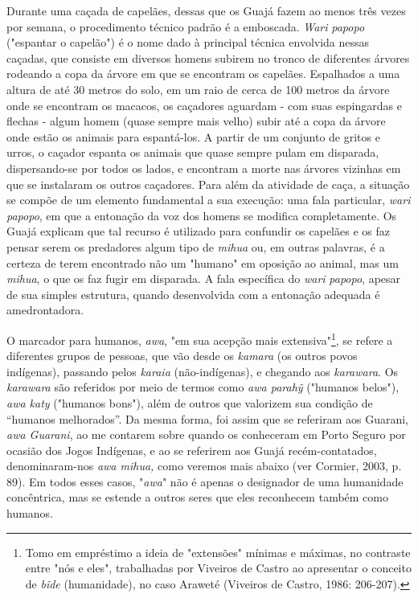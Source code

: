 Durante uma caçada de capelães, dessas que os Guajá fazem ao menos três
vezes por semana, o procedimento técnico padrão é a emboscada.
\emph{Wari} \emph{papopo} ("espantar o capelão") é o nome dado à
principal técnica envolvida nessas caçadas, que consiste em diversos
homens subirem no tronco de diferentes árvores rodeando a copa da árvore
em que se encontram os capelães. Espalhados a uma altura de até 30
metros do solo, em um raio de cerca de 100 metros da árvore onde se
encontram os macacos, os caçadores aguardam - com suas espingardas e
flechas - algum homem (quase sempre mais velho) subir até a copa da
árvore onde estão os animais para espantá-los. A partir de um conjunto
de gritos e urros, o caçador espanta os animais que quase sempre pulam
em disparada, dispersando-se por todos os lados, e encontram a morte nas
árvores vizinhas em que se instalaram os outros caçadores. Para além da
atividade de caça, a situação se compõe de um elemento fundamental a sua
execução: uma fala particular, \emph{wari papopo}, em que a entonação da
voz dos homens se modifica completamente. Os Guajá explicam que tal
recurso é utilizado para confundir os capelães e os faz pensar serem os
predadores algum tipo de \emph{mihua} ou, em outras palavras, é a
certeza de terem encontrado não um "humano" em oposição ao animal, mas
um \emph{mihua}, o que os faz fugir em disparada. A fala específica do
\emph{wari} \emph{papopo}, apesar de sua simples estrutura, quando
desenvolvida com a entonação adequada é amedrontadora.

O marcador para humanos, \emph{awa}, "em sua acepção mais
extensiva"\footnote{Tomo em empréstimo a ideia de "extensões" mínimas e
  máximas, no contraste entre "nós e eles", trabalhadas por Viveiros de
  Castro ao apresentar o conceito de \emph{bĩde} (humanidade), no caso
  Araweté (Viveiros de Castro, 1986: 206-207).}, se refere a diferentes
grupos de pessoas, que vão desde os \emph{kamara} (os outros povos
indígenas), passando pelos \emph{karaia} (não-indígenas), e chegando aos
\emph{karawara}. Os \emph{karawara} são referidos por meio de termos
como \emph{awa parahỹ} ("humanos belos"), \emph{awa katy} ("humanos
bons"), além de outros que valorizem sua condição de ``humanos
melhorados''. Da mesma forma, foi assim que se referiram aos Guarani,
\emph{awa Guarani}, ao me contarem sobre quando os conheceram em Porto
Seguro por ocasião dos Jogos Indígenas, e ao se referirem aos Guajá
recém-contatados, denominaram-nos \emph{awa mihua,} como veremos mais
abaixo (ver Cormier, 2003, p. 89). Em todos esses casos, "\emph{awa}"
não é apenas o designador de uma humanidade concêntrica, mas se estende
a outros seres que eles reconhecem também como humanos.

